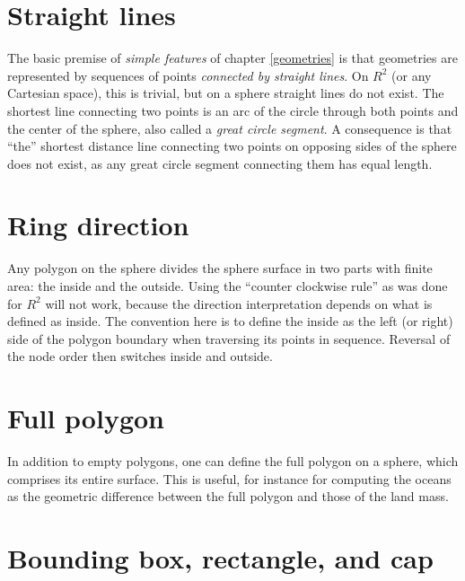 \documentclass[]{book}
\begin{document}
\hypertarget{straight-lines}{%
\section{Straight lines}\label{straight-lines}}

The basic premise of \emph{simple features} of chapter \ref{geometries}
is that geometries are represented by sequences of points \emph{connected
by straight lines}. On \(R^2\) (or any Cartesian space), this is
trivial, but on a sphere straight lines do not exist. The shortest
line connecting two points is an arc of the circle through both
points and the center of the sphere, also called a \emph{great circle
segment}. A consequence is that ``the'' shortest distance line
connecting two points on opposing sides of the sphere does not exist,
as any great circle segment connecting them has equal length.

\hypertarget{ring-direction}{%
\section{Ring direction}\label{ring-direction}}

Any polygon on the sphere divides the sphere surface in two parts
with finite area: the inside and the outside. Using the ``counter
clockwise rule'' as was done for \(R^2\) will not work, because the
direction interpretation depends on what is defined as inside. The
convention here is to define the inside as the left (or right)
side of the polygon boundary when traversing its points in
sequence. Reversal of the node order then switches inside and
outside.

\hypertarget{full-polygon}{%
\section{Full polygon}\label{full-polygon}}

In addition to empty polygons, one can define the
full polygon on a sphere, which comprises its entire surface. This is useful,
for instance for computing the oceans as the geometric difference
between the full polygon and those of the land mass.

\hypertarget{bounding-box-rectangle-and-cap}{%
\section{Bounding box, rectangle, and cap}\label{bounding-box-rectangle-and-cap}}
\end{document}
